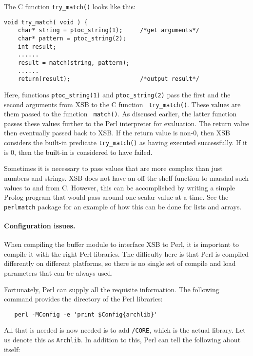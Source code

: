 \documentclass{article}
\begin{document}
{The C function \verb|try_match()| looks like this:

\begin{verbatim}
void try_match( void ) {
    char* string = ptoc_string(1);     /*get arguments*/
    char* pattern = ptoc_string(2);
    int result;
    ......
    result = match(string, pattern);
    ......
    return(result);                    /*output result*/
\end{verbatim}



Here, functions {\tt ptoc\_string(1)} and {\tt ptoc\_string(2)} pass the
first and the second arguments from XSB to the C function {\tt
  try\_match()}. These values are them passed to the function {\tt
  match()}.  As discused earlier, the latter function passes these values
further to the Perl interpreter for evaluation. The return value then
eventually passed back to XSB. If the return value is non-0, then XSB
considers the built-in predicate {\tt try\_match()} as having executed
successfully. If it is 0, then the built-in is considered to have failed.


Sometimes it is necessary to pass values that are more complex than just
numbers and strings. XSB does not have an off-the-shelf function to marshal
such values to and from C. However, this can be accomplished by writing a
simple Prolog program that would pass around one scalar value at a time.
See the {\tt perlmatch} package for an example of how this can be done for
lists and arrays. 

\paragraph{Configuration issues.}
When compiling the buffer module to interface XSB to Perl, it is important
to compile it with the right Perl libraries. The difficulty here is that
Perl is compiled differently on different platforms, so there is no single
set of compile and load parameters that can be always used.

Fortunately, Perl can supply all the requisite information.
The following command provides the directory of the Perl libraries:

\begin{verbatim}
   perl -MConfig -e 'print $Config{archlib}'
\end{verbatim}

All that is needed is now needed is to add {\tt /CORE}, which is the actual
library. Let us denote this as {\tt Archlib}.  In addition to this, Perl
can tell the following about itself:

}
\end{document}
